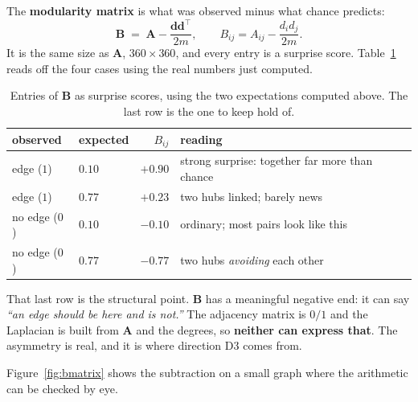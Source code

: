 \documentclass[11pt,a4paper]{article}
\newcommand{\Amat}{\mathbf{A}}
\newcommand{\Bmat}{\mathbf{B}}
\newcommand{\dvec}{\mathbf{d}}
\begin{document}
The \textbf{modularity matrix} is what was observed minus what chance predicts:
\[
  \Bmat \;=\; \Amat - \frac{\dvec\dvec^{\!\top}}{2m},
  \qquad
  B_{ij}=A_{ij}-\frac{d_id_j}{2m}.
\]
It is the same size as $\Amat$, $360\times360$, and every entry is a surprise
score. Table~\ref{tab:surprise} reads off the four cases using the real numbers
just computed.

\begin{table}[h]
\centering\small
\caption{Entries of $\Bmat$ as surprise scores, using the two expectations
computed above. The last row is the one to keep hold of.}
\label{tab:surprise}
\begin{tabular}{@{}llrl@{}}
\toprule
observed & expected & $B_{ij}$ & reading \\
\midrule
edge ($1$)    & $0.10$ & $+0.90$ & strong surprise: together far more than chance \\
edge ($1$)    & $0.77$ & $+0.23$ & two hubs linked; barely news \\
no edge ($0$) & $0.10$ & $-0.10$ & ordinary; most pairs look like this \\
no edge ($0$) & $0.77$ & $\mathbf{-0.77}$ & two hubs \emph{avoiding} each other \\
\bottomrule
\end{tabular}
\end{table}

That last row is the structural point. $\Bmat$ has a meaningful negative end: it
can say \emph{``an edge should be here and is not.''} The adjacency matrix is
$0/1$ and the Laplacian is built from $\Amat$ and the degrees, so
\textbf{neither can express that}. The asymmetry is real, and it is where
direction D3 comes from.

Figure~\ref{fig:bmatrix} shows the subtraction on a small graph where the
arithmetic can be checked by eye.
\end{document}
